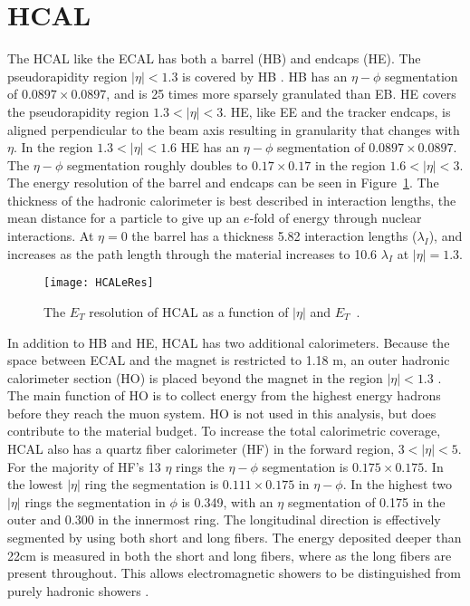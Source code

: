   \section{HCAL}
    The HCAL like the ECAL has both a barrel (HB) and endcaps (HE).
    The pseudorapidity region $|\eta|<1.3$ is covered by HB \cite{tCmsE}. 
    HB has an $\eta-\phi$ segmentation of $0.0897\times0.0897$, and is 25 times more
    	sparsely granulated than EB.
    HE covers the pseudorapidity region $1.3<|\eta|<3$.
    HE, like EE and the tracker endcaps, is aligned perpendicular to the beam axis
    	resulting in granularity that changes with $\eta$.
    In the region $1.3 <|\eta|< 1.6$ HE has an $\eta-\phi$ segmentation of 
    	$0.0897\times0.0897$.
    The $\eta-\phi$ segmentation roughly doubles to $0.17\times0.17$ in the region
    	$1.6 <|\eta|< 3$.
    The energy resolution of the barrel and endcaps can be seen in  
    	Figure~\ref{HCALeRes}.
    The thickness of the hadronic calorimeter is best described in interaction
    	lengths, the mean distance for a particle to give up an $e$-fold of energy
    	through nuclear interactions. 
    At $\eta = 0$ the barrel has a thickness 5.82 interaction lengths 
    	($\lambda_{I}$), and increases as the path length through the material 
    	increases to 10.6 $\lambda_{I}$ at $|\eta| = 1.3$.
    \begin{figure}[h]
      \centering
        \texttt{[image: HCALeRes]}
      \caption{The $E_{T}$ resolution of HCAL as a function of $|\eta|$ and 
        $E_{T}$~\cite{tCmsE}.}
      \label{HCALeRes}
    \end{figure}
    
    In addition to HB and HE, HCAL has two additional calorimeters.
    Because the space between ECAL and the magnet is restricted to 1.18 m, an
    	outer hadronic calorimeter section (HO) is placed beyond the magnet
    	in the region $|\eta|<1.3$ \cite{tCmsE}.
    The main function of HO is to collect energy from the highest energy hadrons
    	before they reach the muon system.
    HO is not used in this analysis, but does contribute to the material budget. 
    To increase the total calorimetric coverage, HCAL also has a quartz fiber 
    	calorimeter (HF) in the forward region, $3 < |\eta| < 5$.
    For the majority of HF's 13 $\eta$ rings the $\eta-\phi$ segmentation is 
    	$0.175\times0.175$.
    In the lowest $|\eta|$ ring the segmentation is $0.111\times0.175$ in 
    	$\eta-\phi$.
    In the highest two $|\eta|$ rings the segmentation in $\phi$ is 0.349, with an
    	$\eta$ segmentation of 0.175 in the outer and 0.300 in the innermost 
    	ring. 
    The longitudinal direction is effectively segmented by using both short and
    	long fibers.
    The energy deposited deeper than 22cm is measured in both the short
    	and long fibers, where as the long fibers are present throughout.
    This allows electromagnetic showers to be distinguished from purely hadronic 
    	showers \cite{tCmsE}.


